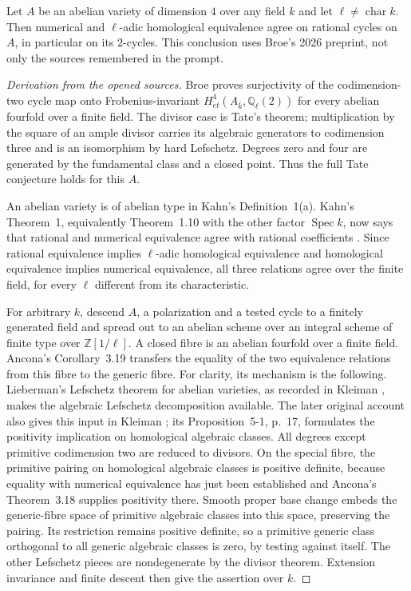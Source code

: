 \begin{theorem}\label{B:abelian}
Let $A$ be an abelian variety of dimension $4$ over any field $k$ and let $\ell\ne\operatorname{char}k$. Then numerical and $\ell$-adic homological equivalence agree on rational cycles on $A$, in particular on its $2$-cycles. This conclusion uses Broe's 2026 preprint, not only the sources remembered in the prompt.
\end{theorem}
\begin{proof}[Derivation from the opened sources]
Broe \cite[Theorem 1.1]{BBroe2026} proves surjectivity of the codimension-two cycle map onto Frobenius-invariant $H^4_{\acute et}(A_{\bar k},\mathbb Q_\ell(2))$ for every abelian fourfold over a finite field. The divisor case is Tate's theorem; multiplication by the square of an ample divisor carries its algebraic generators to codimension three and is an isomorphism by hard Lefschetz. Degrees zero and four are generated by the fundamental class and a closed point. Thus the full Tate conjecture holds for this $A$.

An abelian variety is of abelian type in Kahn's Definition~1(a). Kahn's Theorem~1, equivalently Theorem~1.10 with the other factor $\operatorname{Spec}k$, now says that rational and numerical equivalence agree with rational coefficients \cite{BKahn2003}. Since rational equivalence implies $\ell$-adic homological equivalence and homological equivalence implies numerical equivalence, all three relations agree over the finite field, for every $\ell$ different from its characteristic.

For arbitrary $k$, descend $A$, a polarization and a tested cycle to a finitely generated field and spread out to an abelian scheme over an integral scheme of finite type over $\mathbb Z[1/\ell]$. A closed fibre is an abelian fourfold over a finite field. Ancona's Corollary~3.19 transfers the equality of the two equivalence relations from this fibre to the generic fibre. For clarity, its mechanism is the following. Lieberman's Lefschetz theorem for abelian varieties, as recorded in Kleiman \cite[Theorem 2A11]{BKleiman1968}, makes the algebraic Lefschetz decomposition available. The later original account also gives this input in Kleiman \cite[Theorem~4-1 and Proposition~4-3(2)(c), pp.~14--16]{BKleiman1994}; its Proposition~5-1, p.~17, formulates the positivity implication on homological algebraic classes. All degrees except primitive codimension two are reduced to divisors. On the special fibre, the primitive pairing on homological algebraic classes is positive definite, because equality with numerical equivalence has just been established and Ancona's Theorem~3.18 supplies positivity there. Smooth proper base change embeds the generic-fibre space of primitive algebraic classes into this space, preserving the pairing. Its restriction remains positive definite, so a primitive generic class orthogonal to all generic algebraic classes is zero, by testing against itself. The other Lefschetz pieces are nondegenerate by the divisor theorem. Extension invariance and finite descent then give the assertion over $k$.


\end{proof}
